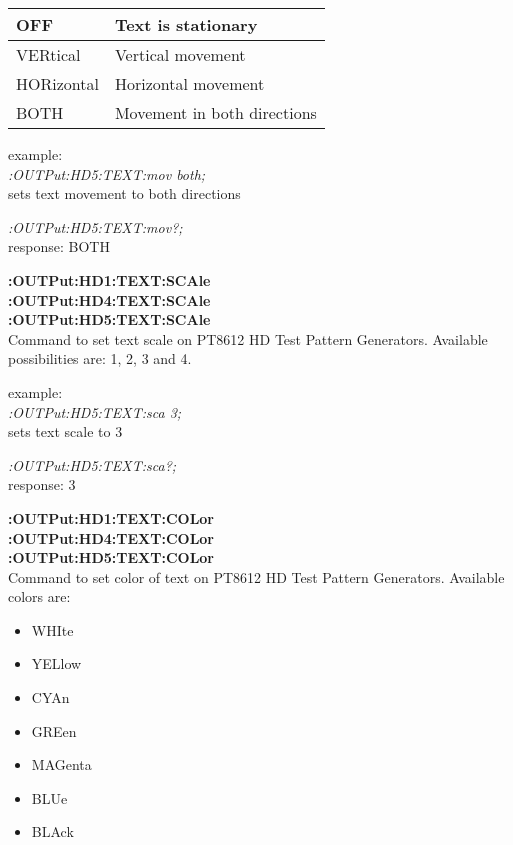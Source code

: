 \begin{tabular}{|l|l|}
\hline
OFF       &   Text is stationary\\ \hline
VERtical  &   Vertical movement\\ \hline
HORizontal&   Horizontal movement\\ \hline
BOTH      &   Movement in both directions \\ \hline
\end{tabular}

example:\\
\textit{:OUTPut:HD5:TEXT:mov both;}\\
sets text movement to both directions

\textit{:OUTPut:HD5:TEXT:mov?;}\\
response: BOTH

\textbf{:OUTPut:HD1:TEXT:SCAle}\\
\textbf{:OUTPut:HD4:TEXT:SCAle}\\
\textbf{:OUTPut:HD5:TEXT:SCAle}\\
Command to set text scale on PT8612 HD Test Pattern Generators. Available possibilities are: 1, 2, 3 and 4.

example:\\
\textit{:OUTPut:HD5:TEXT:sca 3;}\\
sets text scale to 3

\textit{:OUTPut:HD5:TEXT:sca?;}\\
response: 3

\textbf{:OUTPut:HD1:TEXT:COLor}\\
\textbf{:OUTPut:HD4:TEXT:COLor}\\
\textbf{:OUTPut:HD5:TEXT:COLor}\\

Command to set color of text on PT8612 HD Test Pattern Generators. Available colors are:

\begin{itemize}
\item WHIte \\
\item YELlow\\
\item CYAn\\
\item GREen\\
\item MAGenta\\
\item BLUe\\
\item BLAck\\
\end{itemize}

